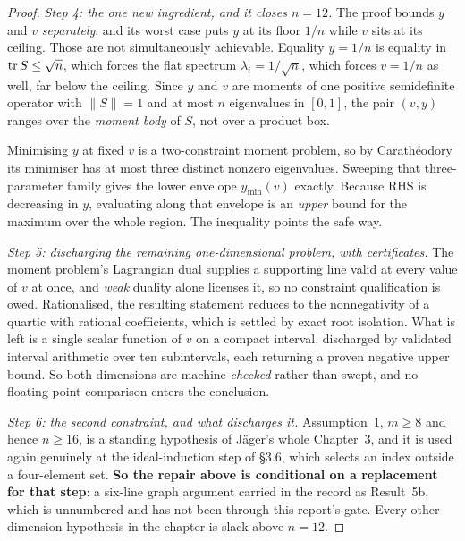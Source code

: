 \begin{proof}
\emph{Step 4: the one new ingredient, and it closes $n=12$.} The proof bounds $y$ and $v$ \emph{separately}, and its worst case puts $y$ at its floor $1/n$ while $v$ sits at its ceiling. Those are not simultaneously achievable. Equality $y=1/n$ is equality in $\operatorname{tr} S\le\sqrt n$, which forces the flat spectrum $\lambda_i=1/\sqrt n$, which forces $v=1/n$ as well, far below the ceiling. Since $y$ and $v$ are moments of one positive semidefinite operator with $\|S\|=1$ and at most $n$ eigenvalues in $[0,1]$, the pair $(v,y)$ ranges over the \emph{moment body} of $S$, not over a product box.

Minimising $y$ at fixed $v$ is a two-constraint moment problem, so by Carath\'eodory its minimiser has at most three distinct nonzero eigenvalues. Sweeping that three-parameter family gives the lower envelope $y_{\min}(v)$ exactly. Because $\mathrm{RHS}$ is decreasing in $y$, evaluating along that envelope is an \emph{upper} bound for the maximum over the whole region. The inequality points the safe way.

\emph{Step 5: discharging the remaining one-dimensional problem, with certificates.} The moment problem's Lagrangian dual supplies a supporting line valid at every value of $v$ at once, and \emph{weak} duality alone licenses it, so no constraint qualification is owed. Rationalised, the resulting statement reduces to the nonnegativity of a quartic with rational coefficients, which is settled by exact root isolation. What is left is a single scalar function of $v$ on a compact interval, discharged by validated interval arithmetic over ten subintervals, each returning a proven negative upper bound. So both dimensions are machine-\emph{checked} rather than swept, and no floating-point comparison enters the conclusion.

\emph{Step 6: the second constraint, and what discharges it.} Assumption~1, $m\ge8$ and hence $n\ge16$, is a standing hypothesis of J\"ager's whole Chapter~3, and it is used again genuinely at the ideal-induction step of \S3.6, which selects an index outside a four-element set. \textbf{So the repair above is conditional on a replacement for that step}: a six-line graph argument carried in the record as Result~5b, which is unnumbered and has not been through this report's gate. Every other dimension hypothesis in the chapter is slack above $n=12$.
\end{proof}

